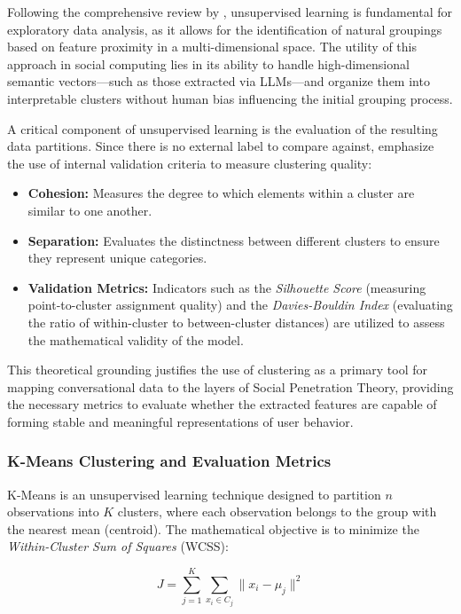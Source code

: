 Following the comprehensive review by \cite{Naeem2023}, unsupervised learning is fundamental for exploratory data analysis, as it allows for the identification of natural groupings based on feature proximity in a multi-dimensional space. The utility of this approach in social computing lies in its ability to handle high-dimensional semantic vectors—such as those extracted via LLMs—and organize them into interpretable clusters without human bias influencing the initial grouping process.



A critical component of unsupervised learning is the evaluation of the resulting data partitions. Since there is no external label to compare against, \cite{Naeem2023} emphasize the use of internal validation criteria to measure clustering quality:
\begin{itemize}
    \item \textbf{Cohesion:} Measures the degree to which elements within a cluster are similar to one another.
    \item \textbf{Separation:} Evaluates the distinctness between different clusters to ensure they represent unique categories.
    \item \textbf{Validation Metrics:} Indicators such as the \textit{Silhouette Score} (measuring point-to-cluster assignment quality) and the \textit{Davies-Bouldin Index} (evaluating the ratio of within-cluster to between-cluster distances) are utilized to assess the mathematical validity of the model.
\end{itemize}

This theoretical grounding justifies the use of clustering as a primary tool for mapping conversational data to the layers of Social Penetration Theory, providing the necessary metrics to evaluate whether the extracted features are capable of forming stable and meaningful representations of user behavior.
    
        
\subsubsection{K-Means Clustering and Evaluation Metrics}

K-Means is an unsupervised learning technique designed to partition $n$ observations into $K$ clusters, where each observation belongs to the group with the nearest mean (centroid). The mathematical objective is to minimize the \textit{Within-Cluster Sum of Squares} (WCSS):

\begin{equation}
    J = \sum_{j=1}^{K} \sum_{x_i \in C_j} \|x_i - \mu_j\|^2
\end{equation}

